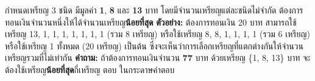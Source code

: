 \question กำหนดเหรียญ 3 ชนิด มีมูลค่า \textbf{1}, \textbf{8} และ \textbf{13} บาท โดยมีจำนวนเหรียญแต่ละชนิดไม่จำกัด ต้องการทอนเงินจำนวนหนึ่งให้ได้จำนวนเหรียญ\textbf{น้อยที่สุด}
\newline
\textbf{ตัวอย่าง:} ต้องการทอนเงิน 20 บาท สามารถใช้เหรียญ 13, 1, 1, 1, 1, 1, 1, 1 (รวม 8 เหรียญ) หรือใช้เหรียญ 8, 8, 1, 1, 1, 1 (รวม 6 เหรียญ) หรือใช้เหรียญ 1 ทั้งหมด (20 เหรียญ) เป็นต้น ซึ่งจะเห็นว่าการเลือกเหรียญที่แตกต่างกันให้จำนวนเหรียญรวมที่ไม่เท่ากัน
\newline
\textbf{คำถาม:} ถ้าต้องการทอนเงินจำนวน \textbf{77} บาท ด้วยเหรียญ \{1, 8, 13\} บาท จะต้องใช้เหรียญ\textbf{น้อยที่สุด}กี่เหรียญ
\newline\newline
ตอบ ในกระดาษคำตอบ \newline
%
%
